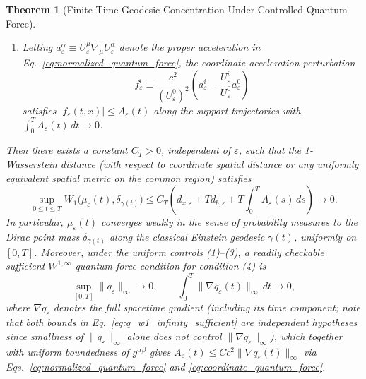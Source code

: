\documentclass[11pt, a4paper]{article}
\newtheorem{theorem}{Theorem}[section]
\theoremstyle{definition}
\begin{document}
\begin{theorem}[Finite-Time Geodesic Concentration Under Controlled Quantum Force]
\begin{enumerate}[label=(\arabic*)]
\begin{equation}
    \end{equation}
    \item Letting $a_\varepsilon^\alpha \equiv U_\varepsilon^\mu \nabla_\mu U_\varepsilon^\alpha$ denote the proper acceleration in Eq.~\eqref{eq:normalized_quantum_force}, the coordinate-acceleration perturbation
    \begin{equation}
    \label{eq:coordinate_quantum_force}
    f_\varepsilon^i \equiv \frac{c^2}{(U_\varepsilon^0)^2}\left( a_\varepsilon^i - \frac{U_\varepsilon^i}{U_\varepsilon^0} a_\varepsilon^0 \right)
    \end{equation}
    satisfies $|f_\varepsilon(t, x)| \le A_\varepsilon(t)$ along the support trajectories with $\int_0^T A_\varepsilon(t)\,dt \to 0$.
\end{enumerate}
Then there exists a constant $C_T > 0$, independent of $\varepsilon$, such that the 1-Wasserstein distance (with respect to coordinate spatial distance or any uniformly equivalent spatial metric on the common region) satisfies
\begin{equation}
\label{eq:wasserstein_concentration_bound}
\sup_{0 \le t \le T} W_1\big(\mu_\varepsilon(t), \delta_{\gamma(t)}\big) \le C_T \left( d_{x,\varepsilon} + T d_{b,\varepsilon} + T\int_0^T A_\varepsilon(s)\,ds \right) \longrightarrow 0.
\end{equation}
In particular, $\mu_\varepsilon(t)$ converges weakly in the sense of probability measures to the Dirac point mass $\delta_{\gamma(t)}$ along the classical Einstein geodesic $\gamma(t)$, uniformly on $[0, T]$. Moreover, under the uniform controls (1)--(3), a readily checkable sufficient $W^{1,\infty}$ quantum-force condition for condition (4) is
\begin{equation}
\label{eq:q_w1_infinity_sufficient}
\sup_{[0, T]} \|q_\varepsilon\|_\infty \longrightarrow 0, \qquad \int_0^T \|\nabla q_\varepsilon(t)\|_\infty\,dt \longrightarrow 0,
\end{equation}
where $\nabla q_\varepsilon$ denotes the full spacetime gradient (including its time component; note that both bounds in Eq.~\eqref{eq:q_w1_infinity_sufficient} are independent hypotheses since smallness of $\|q_\varepsilon\|_\infty$ alone does not control $\|\nabla q_\varepsilon\|_\infty$), which together with uniform boundedness of $g^{\alpha\beta}$ gives $A_\varepsilon(t) \le C c^2 \|\nabla q_\varepsilon(t)\|_\infty$ via Eqs.~\eqref{eq:normalized_quantum_force} and \eqref{eq:coordinate_quantum_force}.
\end{theorem}
\end{document}
